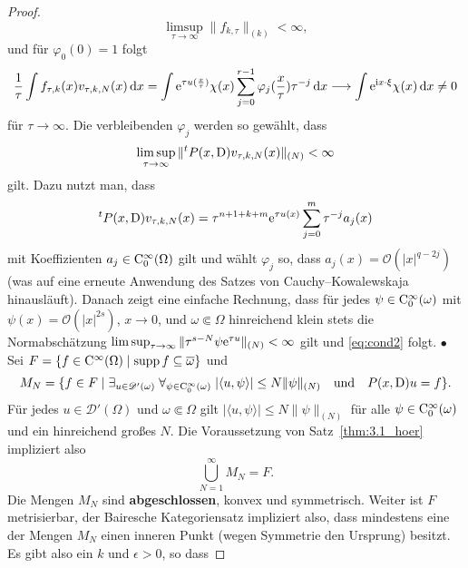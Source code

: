 \begin{proof}
\begin{equation}\label{eq:cond1}
    \limsup_{\tau\to\infty} \| f_{k,\tau}\|_{(k)} < \infty,
\end{equation}
und für $\varphi_0(0)=1$ folgt
\begin{equation}\label{eq:cond3}
   \frac1\tau \int f_{\tau,k}(x) v_{\tau,k,N}(x)\,\mathrm d x = \int \mathrm e^{\tau u(\frac x\tau)} \chi(x) \sum_{j=0}^{r-1} \varphi_j(\frac x\tau) \tau^{-j} \,\mathrm d x \longrightarrow \int \mathrm e^{\mathrm i x\cdot\xi}\chi(x)\,\mathrm d x\ne0
\end{equation}
für $\tau\to\infty$. Die verbleibenden $\varphi_j$ werden so gewählt, dass 
\begin{equation}\label{eq:cond2}
   \limsup_{\tau\to\infty} \|{}^tP(x,\mathrm D) v_{\tau,k,N}(x)\|_{(N)} <\infty 
\end{equation}
gilt. Dazu nutzt man, dass 
\begin{equation}
{}^tP(x,\mathrm D) v_{\tau,k,N}(x)=\tau^{n+1+k+m}  \mathrm e^{\tau u(x)} \sum_{j=0}^m \tau^{-j} a_j(x) 
\end{equation}
mit Koeffizienten $a_j\in\mathrm C_0^\infty(\Omega)$ gilt und wählt $\varphi_j$ so, dass $a_j(x)=\mathcal O(|x|^{q-2j})$ (was auf eine erneute Anwendung des Satzes von Cauchy--Kowalewskaja hinausläuft). Danach zeigt eine einfache Rechnung, dass für jedes $\psi\in\mathrm C_0^\infty(\omega)$ mit $\psi(x)=\mathcal O(|x|^{2s})$, $x\to0$,
und $\omega\Subset\Omega$ hinreichend klein stets die Normabschätzung $\limsup_{\tau\to\infty} \|\tau^{s-N}\psi \mathrm e^{\tau u}\|_{(N)}<\infty$ gilt und \eqref{eq:cond2} folgt. 
$\bullet$  Sei $F=\{f\in\mathrm C^\infty(\Omega) \mid \operatorname{supp} f\subseteq\overline\omega\}$ und 
\begin{equation}
   M_N = \{ f\in F\mid \exists_{u\in\mathscr D'(\omega)} \; \forall_{\psi\in\mathrm C_0^\infty(\omega)}\; |\langle u,\psi\rangle | \le N \|\psi\|_{(N)} \quad\text{und}\quad P(x,\mathrm D)u=f \}.
\end{equation}
Für jedes $u\in\mathscr D'(\Omega)$ und $\omega\Subset\Omega$ gilt $ |\langle u,\psi\rangle | \le N \|\psi\|_{(N)}$ für alle $\psi\in\mathrm C_0^\infty(\omega)$ und ein hinreichend großes $N$. Die Voraussetzung von Satz~\ref{thm:3.1_hoer} 
impliziert also
\begin{equation}
   \bigcup_{N=1}^\infty M_N = F.
\end{equation} 
Die Mengen $M_N$ sind {\bf abgeschlossen},  konvex und symmetrisch. Weiter ist $F$ metrisierbar, der Bairesche Kategoriensatz impliziert also, dass mindestens eine der Mengen $M_N$ einen inneren Punkt (wegen Symmetrie den Ursprung) besitzt. Es gibt also ein $k$ und $\epsilon>0$, so dass

\end{proof}
